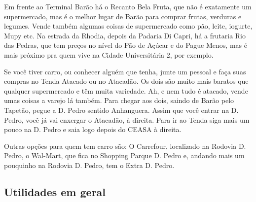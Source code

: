 Em frente ao Terminal Barão há o Recanto Bela Fruta, que não é exatamente um
supermercado, mas é o melhor lugar de Barão para comprar frutas, verduras e
legumes. Vende também algumas coisas de supermercado como pão, leite, iogurte,
Mupy etc. Na estrada da Rhodia, depois da Padaria Di Capri, há a frutaria Rio
das Pedras, que tem preços no nível do Pão de Açúcar e do Pague Menos, mas é
mais próximo pra quem vive na Cidade Universitária 2, por exemplo.

Se você tiver carro, ou conhecer alguém que tenha, junte um pessoal e faça suas
compras no Tenda Atacado ou no Atacadão. Os dois são muito mais baratos que
qualquer supermercado e têm muita variedade. Ah, e nem tudo é atacado, vende
umas coisas a varejo lá também. Para chegar aos dois, saindo de Barão pelo
Tapetão, pegue a D. Pedro sentido Anhanguera. Assim que você entrar na D. Pedro,
você já vai enxergar o Atacadão, à direita. Para ir ao Tenda siga mais um pouco
na D. Pedro e saia logo depois do CEASA à direita.

Outras opções para quem tem carro são: O Carrefour, localizado na Rodovia D.
Pedro, o Wal-Mart, que fica no Shopping Parque D. Pedro e, andando mais um 
pouquinho na Rodovia D. Pedro, tem o Extra D. Pedro.

\subsection{Utilidades em geral}

